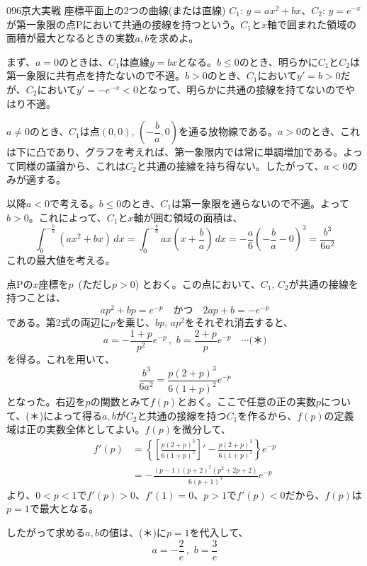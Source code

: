 \begin{thm}{096}{}{京大実戦}
 座標平面上の2つの曲線(または直線) $C_1$: $y=ax^2+bx$、$C_2$: $y=e^{-x}$が第一象限の点Pにおいて共通の接線を持つという。$C_1$と$x$軸で囲まれた領域の面積が最大となるときの実数$a, b$を求めよ。
\end{thm}

まず、$a=0$のときは、$C_1$は直線$y=bx$となる。$b\le 0$のとき、明らかに$C_1$と$C_2$は第一象限に共有点を持たないので不適。$b>0$のとき、$C_1$において$y'=b>0$だが、$C_2$において$y'=-e^{-x}<0$となって、明らかに共通の接線を持てないのでやはり不適。

$a\neq 0$のとき、$C_1$は点$(0,0)$, $\left(-\dfrac{b}{a}, 0\right)$を通る放物線である。$a>0$のとき、これは下に凸であり、グラフを考えれば、第一象限内では常に単調増加である。よって同様の議論から、これは$C_2$と共通の接線を持ち得ない。したがって、$a<0$のみが適する。

以降$a<0$で考える。$b\le 0$のとき、$C_1$は第一象限を通らないので不適。よって$b>0$。これによって、$C_1$と$x$軸が囲む領域の面積は、
\[ \int_0^{-\frac{b}{a}}\! (ax^2+bx) \,dx = \int_0^{-\frac{b}{a}}\! ax\left(x+\frac{b}{a}\right) \,dx = -\frac{a}{6}\left(-\frac{b}{a}-0\right)^3=\frac{b^3}{6a^2} \]
これの最大値を考える。

点Pの$x$座標を$p$~(ただし$p>0$) とおく。この点において、$C_1$, $C_2$が共通の接線を持つことは、
\[ ap^2+bp=e^{-p} \quad\text{かつ}\quad 2ap+b=-e^{-p} \]
である。第2式の両辺に$p$を乗じ、$bp$, $ap^2$をそれぞれ消去すると、
\[ a=-\frac{1+p}{p^2}e^{-p} \,,\,\, b=\frac{2+p}{p}e^{-p} \quad\cdots\text{(＊)} \]
を得る。これを用いて、
\[ \frac{b^3}{6a^2}=\frac{p(2+p)^3}{6(1+p)^2}e^{-p} \]
となった。右辺を$p$の関数とみて$f(p)$とおく。ここで任意の正の実数$p$について、(＊)によって得る$a, b$が$C_2$と共通の接線を持つ$C_1$を作るから、$f(p)$の定義域は正の実数全体としてよい。$f(p)$を微分して、
\begin{align*}
 f'(p)&=\left\{\left[\frac{p(2+p)^3}{6(1+p)^2}\right]'-\frac{p(2+p)^3}{6(1+p)^2}\right\}e^{-p} \\
 &=-\frac{(p-1)(p+2)^2(p^2+2p+2)}{6(p+1)^3}e^{-p}
\end{align*}
より、$0<p<1$で$f'(p)>0$、$f'(1)=0$、$p>1$で$f'(p)<0$だから、$f(p)$は$p=1$で最大となる。

したがって求める$a, b$の値は、(＊)に$p=1$を代入して、
\[ a=-\frac{2}{e} \,,\,\, b=\frac{3}{e} \]